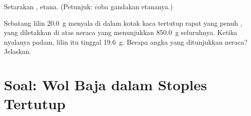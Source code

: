 \begin{exercise}[$\star\star\star$]\label{exo:g8:balanced-equations:11}
Setarakan ,  etana. (Petunjuk: coba %
gandakan etananya.)
\end{exercise}

\begin{exercise}[$\star\star\star$]\label{exo:g8:balanced-equations:12}
Sebatang lilin \qty{20.0}{g} menyala di dalam kotak kaca tertutup rapat
yang penuh , yang diletakkan di atas neraca yang menunjukkan
\qty{850.0}{g} seluruhnya. Ketika nyalanya padam, lilin itu tinggal
\qty{19.6}{g}. Berapa angka yang ditunjukkan neraca? Jelaskan.
\end{exercise}

\section{Soal: Wol Baja dalam Stoples Tertutup}

